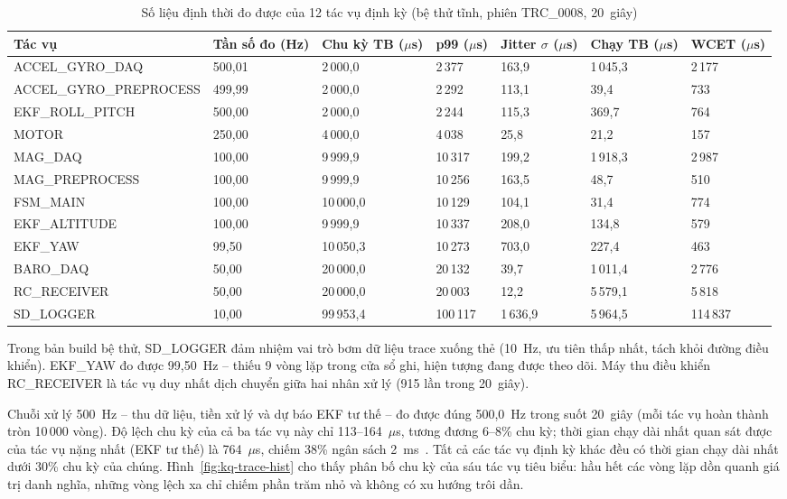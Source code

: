 \begin{table}[h]
\centering
\footnotesize
\setlength{\tabcolsep}{3pt}
\caption{Số liệu định thời đo được của 12 tác vụ định kỳ (bệ thử tĩnh, phiên TRC\_0008, 20~giây)}
\label{tab:kq-trace}
\begin{tabular}{lp{1.5cm}p{1.7cm}p{1.4cm}p{1.5cm}p{1.5cm}p{1.4cm}}
\toprule
Tác vụ & Tần số đo (Hz) & Chu kỳ TB ($\mu$s) & p99 ($\mu$s) & Jitter $\sigma$ ($\mu$s) & Chạy TB ($\mu$s) & WCET ($\mu$s) \\
\midrule
ACCEL\_GYRO\_DAQ & 500,01 & 2\,000,0 & 2\,377 & 163,9 & 1\,045,3 & 2\,177 \\
ACCEL\_GYRO\_PREPROCESS & 499,99 & 2\,000,0 & 2\,292 & 113,1 & 39,4 & 733 \\
EKF\_ROLL\_PITCH & 500,00 & 2\,000,0 & 2\,244 & 115,3 & 369,7 & 764 \\
MOTOR & 250,00 & 4\,000,0 & 4\,038 & 25,8 & 21,2 & 157 \\
MAG\_DAQ & 100,00 & 9\,999,9 & 10\,317 & 199,2 & 1\,918,3 & 2\,987 \\
MAG\_PREPROCESS & 100,00 & 9\,999,9 & 10\,256 & 163,5 & 48,7 & 510 \\
FSM\_MAIN & 100,00 & 10\,000,0 & 10\,129 & 104,1 & 31,4 & 774 \\
EKF\_ALTITUDE & 100,00 & 9\,999,9 & 10\,337 & 208,0 & 134,8 & 579 \\
EKF\_YAW & 99,50 & 10\,050,3 & 10\,273 & 703,0 & 227,4 & 463 \\
BARO\_DAQ & 50,00 & 20\,000,0 & 20\,132 & 39,7 & 1\,011,4 & 2\,776 \\
RC\_RECEIVER & 50,00 & 20\,000,0 & 20\,003 & 12,2 & 5\,579,1 & 5\,818 \\
SD\_LOGGER & 10,00 & 99\,953,4 & 100\,117 & 1\,636,9 & 5\,964,5 & 114\,837 \\
\bottomrule
\end{tabular}

{\footnotesize
Trong bản build bệ thử, SD\_LOGGER đảm nhiệm vai trò bơm dữ liệu trace xuống thẻ (10~Hz, ưu tiên thấp nhất, tách khỏi đường điều khiển). EKF\_YAW đo được 99,50~Hz -- thiếu 9 vòng lặp trong cửa sổ ghi, hiện tượng đang được theo dõi. Máy thu điều khiển RC\_RECEIVER là tác vụ duy nhất dịch chuyển giữa hai nhân xử lý (915 lần trong 20~giây).}
\end{table}

Chuỗi xử lý 500~Hz -- thu dữ liệu, tiền xử lý và dự báo EKF tư thế -- đo được đúng 500,0~Hz trong suốt 20~giây (mỗi tác vụ hoàn thành tròn 10\,000 vòng). Độ lệch chu kỳ của cả ba tác vụ này chỉ 113--164~$\mu$s, tương đương 6--8\% chu kỳ; thời gian chạy dài nhất quan sát được của tác vụ nặng nhất (EKF tư thế) là 764~$\mu$s, chiếm 38\% ngân sách 2~ms~\cite{cervin2003}. Tất cả các tác vụ định kỳ khác đều có thời gian chạy dài nhất dưới 30\% chu kỳ của chúng. Hình~\ref{fig:kq-trace-hist} cho thấy phân bố chu kỳ của sáu tác vụ tiêu biểu: hầu hết các vòng lặp dồn quanh giá trị danh nghĩa, những vòng lệch xa chỉ chiếm phần trăm nhỏ và không có xu hướng trôi dần.

